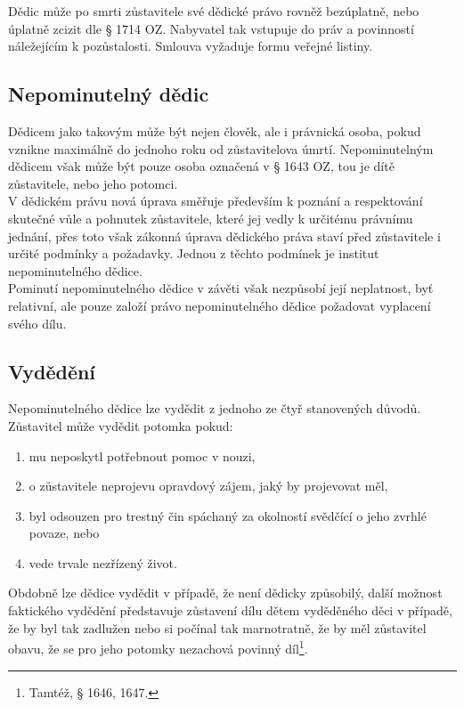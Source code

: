 \documentclass{article}
\begin{document}
Dědic může po smrti zůstavitele své dědické právo rovněž bezúplatně, nebo úplatně zcizit dle § 1714 OZ. Nabyvatel tak vstupuje do práv a povinností náležejícím k pozůstalosti. Smlouva vyžaduje formu veřejné listiny.\\

\subsection{Nepominutelný dědic}

Dědicem jako takovým může být nejen člověk, ale i právnická osoba, pokud vznikne maximálně do jednoho roku od zůstavitelova úmrtí. Nepominutelným dědicem však může být pouze osoba označená v § 1643 OZ, tou je dítě zůstavitele, nebo jeho potomci.\\

V dědickém právu nová úprava směřuje především k poznání a respektování skutečné vůle a pohnutek zůstavitele, které jej vedly k určitému právnímu jednání, přes toto však zákonná úprava dědického práva staví před zůstavitele i určité podmínky a požadavky. Jednou z těchto podmínek je institut nepominutelného dědice.\\

Pominutí nepominutelného dědice v závěti však nezpůsobí její neplatnost, byť relativní, ale pouze založí právo nepominutelného dědice požadovat vyplacení svého dílu.\\

\subsection{Vydědění}

Nepominutelného dědice lze vydědit z jednoho ze čtyř stanovených důvodů. Zůstavitel může vydědit potomka pokud:

\begin{enumerate}
\item mu neposkytl potřebnout pomoc v nouzi,
\item o zůstavitele neprojevu opravdový zájem, jaký by projevovat měl,
\item byl odsouzen pro trestný čin spáchaný za okolností svědčící o jeho zvrhlé povaze, nebo
\item vede trvale nezřízený život.
\end{enumerate}

Obdobně lze dědice vydědit v případě, že není dědicky způsobilý, další možnost faktického vydědění představuje zůstavení dílu dětem vyděděného děci v případě, že by byl tak zadlužen nebo si počínal tak marnotratně, že by měl zůstavitel obavu, že se pro jeho potomky nezachová povinný díl\footnote{Tamtéž, § 1646, 1647.}.\\
\end{document}

